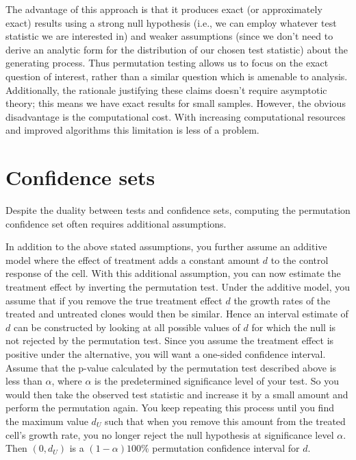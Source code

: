 The advantage of this approach is that it produces exact (or approximately
exact) results using a strong null hypothesis (i.e., we can employ whatever
test statistic we are interested in) and weaker assumptions (since we don't
need to derive an analytic form for the distribution of our chosen test
statistic) about the generating process. Thus permutation testing allows us to
focus on the exact question of interest, rather than a similar question which
is amenable to analysis.  Additionally, the rationale justifying these claims
doesn't require asymptotic theory; this means we have exact results for small
samples. However, the obvious disadvantage is the computational cost.  With
increasing computational resources and improved algorithms this limitation
is less of a problem.

\section{Confidence sets}

Despite the duality between tests and confidence sets, computing the permutation
confidence set often requires additional assumptions.  

\begin{example}[continues=exa:cont] In addition to the above stated
assumptions, you further assume an additive model where the effect of treatment
adds a constant amount $d$ to the control response of the cell.  With this
additional assumption, you can now estimate the treatment effect by inverting
the permutation test.  Under the additive model, you assume that if you remove
the true treatment effect $d$ the growth rates of the treated and untreated
clones would then be similar.  Hence an interval estimate of $d$ can be
constructed by looking at all possible values of $d$ for which the null is not
rejected by the permutation test.  Since you assume the treatment effect is
positive under the alternative, you will want a one-sided confidence interval.
Assume that the p-value calculated by the permutation test described above is
less than $\alpha$, where $\alpha$ is the predetermined significance level of
your test.  So you would then take the observed test statistic and increase it
by a small amount and perform the permutation again.  You keep repeating this
process until you find the maximum value $d_U$ such that when you remove this
amount from the treated cell's growth rate, you no longer reject the null
hypothesis at significance level $\alpha$.  Then $(0, d_U)$ is a $(1-\alpha)100\%$
permutation confidence interval for $d$.
\end{example}


